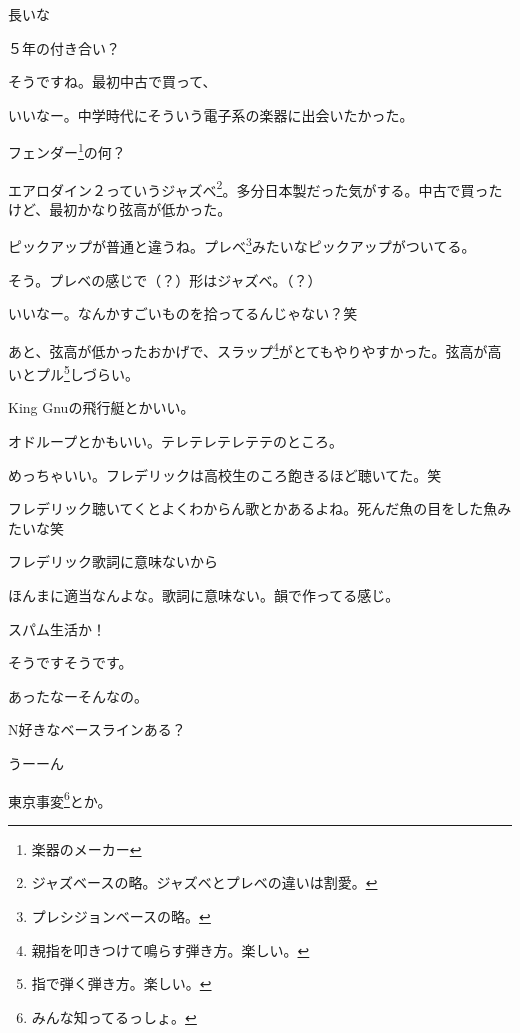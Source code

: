 \begin{multicols}{3}
長いな

５年の付き合い？

そうですね。最初中古で買って、

いいなー。中学時代にそういう電子系の楽器に出会いたかった。

フェンダー\footnote{楽器のメーカー}の何？

エアロダイン２っていうジャズベ\footnote{ジャズベースの略。ジャズベとプレベの違いは割愛。}。多分日本製だった気がする。中古で買ったけど、最初かなり弦高が低かった。

ピックアップが普通と違うね。プレベ\footnote{プレシジョンベースの略。}みたいなピックアップがついてる。

そう。プレベの感じで（？）形はジャズベ。（？）

いいなー。なんかすごいものを拾ってるんじゃない？笑

あと、弦高が低かったおかげで、スラップ\footnote{親指を叩きつけて鳴らす弾き方。楽しい。}がとてもやりやすかった。弦高が高いとプル\footnote{指で弾く弾き方。楽しい。}しづらい。
 

\vspace{10mm}
\noindent{}

King Gnuの飛行艇とかいい。

オドループとかもいい。テレテレテレテテのところ。

めっちゃいい。フレデリックは高校生のころ飽きるほど聴いてた。笑

フレデリック聴いてくとよくわからん歌とかあるよね。死んだ魚の目をした魚みたいな笑

フレデリック歌詞に意味ないから

ほんまに適当なんよな。歌詞に意味ない。韻で作ってる感じ。

スパム生活か！

そうですそうです。

あったなーそんなの。

N好きなベースラインある？

うーーん

東京事変\footnote{みんな知ってるっしょ。}とか。


\end{multicols}
